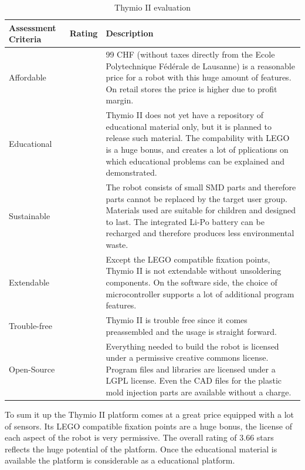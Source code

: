 \documentclass[11pt,a4paper]{article}
\newcounter{starnumber}
\newcommand{\stars}[1]{
  \forloop{starnumber}{1}{\value{starnumber} < 6}{
    \ifthenelse{#1 < \value{starnumber}}{\ding{73}}{\ding{72}}%
  }
}
\begin{document}
\begin{table}[h!]
\centering
\begin{tabular}{p{}p{}p{}}
\toprule
Assessment Criteria    & Rating & Description \\
\midrule
Affordable  & \stars{4}    & 99 CHF (without taxes directly from the Ecole Polytechnique Fédérale de Lausanne) is a reasonable price for a robot with this huge amount of features. On retail stores the price is higher due to profit margin.\\
Educational & \stars{3}     & Thymio II does not yet have a repository of educational material only, but it is planned to release such material. The compability with LEGO is a huge bonus, and creates a lot of pplications on which educational problems can be explained and demonstrated.\\
Sustainable  & \stars{3}     & The robot consists of small SMD parts and therefore parts cannot be replaced by the target user group. Materials used are suitable for children and designed to last. The integrated Li-Po battery can be recharged and therefore produces less environmental waste.\\
Extendable & \stars{3} & Except the LEGO compatible fixation points, Thymio II is not extendable without unsoldering components. On the software side, the choice of microcontroller supports a lot of additional program features.\\
Trouble-free & \stars{4} & Thymio II is trouble free since it comes preassembled and the usage is straight forward.\\
Open-Source & \stars{5} & Everything needed to build the robot is licensed under a permissive creative commons license. Program files and libraries are licensed under a LGPL license. Even the CAD files for the plastic mold injection parts are available without a charge.\\
\bottomrule
\end{tabular}
\caption{Thymio II evaluation}
\label{tbl:thymio_eval}
\end{table}

To sum it up the Thymio II platform comes at a great price equipped with a lot of sensors. Its LEGO compatible fixation points are a huge bonus, the license of each aspect of the robot is very permissive. The overall rating of 3.66 stars reflects the huge potential of the platform. Once the educational material is available the platform is considerable as a educational platform.
\end{document}

